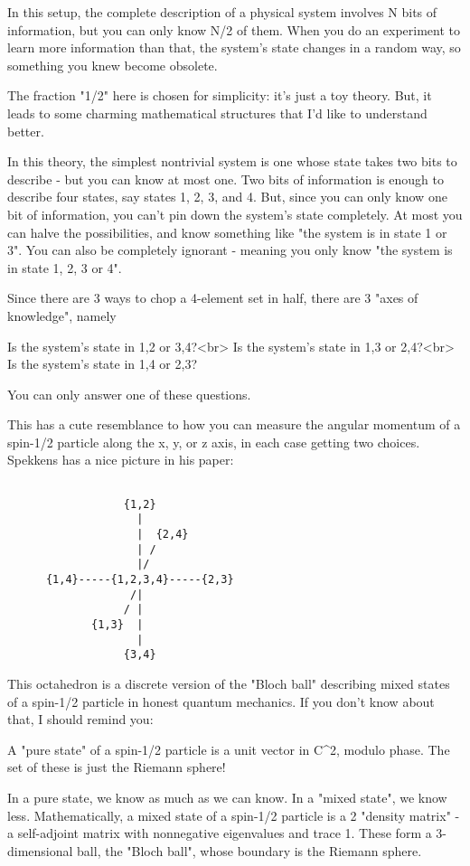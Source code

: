 In this setup, the complete description of a physical system involves
N bits of information, but you can only know N/2 of them.  When you do 
an experiment to learn more information than that, the system's state 
changes in a random way, so something you knew become obsolete.

The fraction "1/2" here is chosen for simplicity: it's just a toy 
theory.  But, it leads to some charming mathematical structures 
that I'd like to understand better.

In this theory, the simplest nontrivial system is one whose state
takes two bits to describe - but you can know at most one.  Two bits 
of information is enough to describe four states, say states 1, 2, 3, 
and 4.  But, since you can only know one bit of information, you can't 
pin down the system's state completely.  At most you can halve the 
possibilities, and know something like "the system is in state 1 or 3".  
You can also be completely ignorant - meaning you only know "the 
system is in state 1, 2, 3 or 4".

Since there are 3 ways to chop a 4-element set in half, there are 
3 "axes of knowledge", namely

Is the system's state in {1,2} or {3,4}?<br>
Is the system's state in {1,3} or {2,4}?<br>
Is the system's state in {1,4} or {2,3}?

You can only answer one of these questions.

This has a cute resemblance to how you can measure the angular
momentum of a spin-1/2 particle along the x, y, or z axis, in 
each case getting two choices.  Spekkens has a nice picture
in his paper:
 

\begin{verbatim}

                  {1,2}
                    |
                    |  {2,4}
                    | /
                    |/       
      {1,4}-----{1,2,3,4}-----{2,3}
                   /| 
                  / |
             {1,3}  |
                    |
                  {3,4} 
\end{verbatim}
    

This octahedron is a discrete version of the "Bloch ball" describing 
mixed states of a spin-1/2 particle in honest quantum mechanics.  If
you don't know about that, I should remind you:

A "pure state" of a spin-1/2 particle is a unit vector in
C^{2}, modulo phase.  The set of these is just the Riemann sphere!

In a pure state, we know as much as we can know.  In a "mixed state",
we know less.  Mathematically, a mixed state of a spin-1/2 particle 
is a 2 "density matrix" - a self-adjoint matrix with nonnegative 
eigenvalues and trace 1.  These form a 3-dimensional ball, the "Bloch 
ball", whose boundary is the Riemann sphere.  

